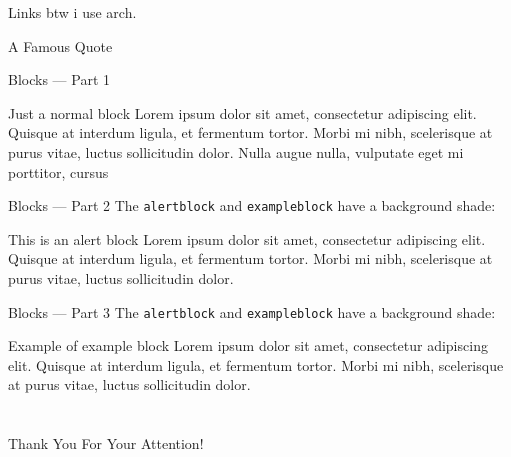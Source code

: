 \documentclass[17pt,aspectratio=169]{beamer}
\begin{document}
\begin{frame}{Links}
  btw i use arch\footnotemark.
\end{frame}

\begin{frame}{A Famous Quote}
\end{frame}

\begin{frame}{Blocks --- Part 1}
  \begin{block}{Just a normal block}
    Lorem ipsum dolor sit amet, consectetur adipiscing elit. Quisque at interdum
    ligula, et fermentum tortor. Morbi mi nibh, scelerisque at purus vitae,
    luctus sollicitudin dolor. Nulla augue nulla, vulputate eget mi porttitor,
    cursus
  \end{block}
\end{frame}

\begin{frame}{Blocks --- Part 2}
  The \texttt{alertblock} and \texttt{exampleblock} have a background shade:
  \begin{alertblock}{This is an alert block}
    Lorem ipsum dolor sit amet, consectetur adipiscing elit. Quisque at interdum
    ligula, et fermentum tortor. Morbi mi nibh, scelerisque at purus vitae,
    luctus sollicitudin dolor.
  \end{alertblock}
\end{frame}

\begin{frame}{Blocks --- Part 3}
  The \texttt{alertblock} and \texttt{exampleblock} have a background shade:
  \begin{exampleblock}{Example of example block}
    Lorem ipsum dolor sit amet, consectetur adipiscing elit. Quisque at interdum
    ligula, et fermentum tortor. Morbi mi nibh, scelerisque at purus vitae,
    luctus sollicitudin dolor.
  \end{exampleblock}
\end{frame}

\part{} %
\begin{frame}
  \begin{center}
    \vfill
    \LARGE Thank You For Your Attention!
    \vfill
    \contactinformation%
  \end{center}
\end{frame}
\end{document}
